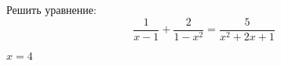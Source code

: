 \begin{ex}
	Решить уравнение:
	$$ \dfrac{1}{x-1}+\dfrac{2}{1-x^2}=\dfrac{5}{x^2+2x+1} $$
	\begin{answer}
		$x=4$
	\end{answer}
\end{ex}